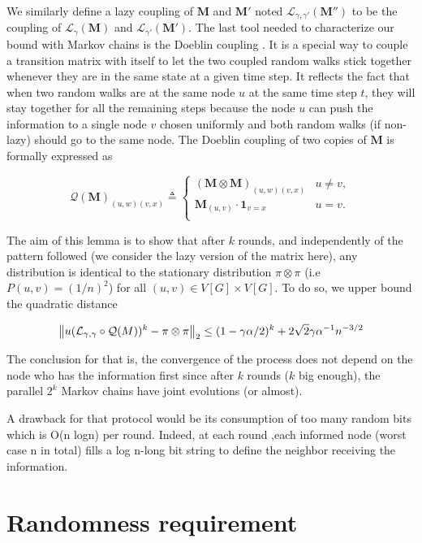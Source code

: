 \documentclass[10pt,journal,a4paper]{IEEEtran}
\begin{document}
We similarly define a lazy coupling of $\mathbf{M}$ and $\mathbf{M'}$ noted $\mathcal L_{\gamma, \gamma'}(\mathbf{M''})$ to be the coupling of $\mathcal L_\gamma(\mathbf{M})$ and $\mathcal L_{\gamma'}(\mathbf{M'})$. The last tool needed to characterize our bound with Markov chains is the Doeblin coupling \cite{coupling}. It is a special way to couple a transition matrix with itself to let the two coupled random walks stick together whenever they are in the same state at a given time step. It reflects the fact that when two random walks are at the same node $u$ at the same time step $t$, they will stay together for all the remaining steps because the node $u$ can push the information to a single node $v$ chosen uniformly and both random walks (if non-lazy) should go to the same node. The Doeblin coupling of two copies of $\mathbf{M}$ is formally expressed as

\[
  \mathcal Q(\mathbf{M})_{(u,w)(v,x)} \triangleq \left\{
    \begin{array}{ll}
      (\mathbf{M} \otimes \mathbf{M})_{(u,w)(v,x)} & u \not = v,\\
      \mathbf{M}_{(u,v)} \cdot \mathbf{1}_{v = x} & u = v.\\
    \end{array}
  \right.
\]

The aim of this lemma is to show that after $k$ rounds, and independently of the pattern followed (we consider the lazy version of the matrix here), any distribution is identical to the stationary distribution $\pi \otimes \pi$ (i.e $P(u,v)=(1/n)^2$) for all $(u,v) \in V[G] \times V[G]$. To do so, we upper bound the quadratic distance

\[
  \left\lVert u(\mathcal L_{\gamma,\gamma} \circ \mathcal Q(M))^k - \pi \otimes \pi\right\rVert_2 \leq (1 - \gamma \alpha / 2)^k + 2 \sqrt 2 \gamma \alpha^{-1} n^{-3/2}
\]

The conclusion for that is, the convergence of the process does not depend on the node who has the information first since after $k$ rounds ($k$ big enough), the parallel $2^k$ Markov chains have joint evolutions (or almost).

A drawback for that protocol would be its consumption of too many random bits which is O(n logn) per round. Indeed, at each round ,each informed node (worst case n in total) fills a log n-long bit string to define the neighbor receiving the information.

\section{Randomness requirement}
\end{document}
